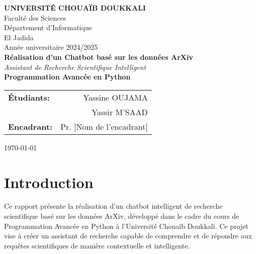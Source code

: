 \documentclass[12pt,a4paper]{article}
\begin{document}
\begin{titlepage}
    \centering
    
    {\Large\textbf{UNIVERSITÉ CHOUAÏB DOUKKALI}}\\[0.5cm]
    {\large Faculté des Sciences}\\[0.2cm]
    {\large Département d'Informatique}\\[0.2cm]
    {\large El Jadida}\\[2cm]
    
    {\large Année universitaire 2024/2025}\\[3cm]
    
    {\Huge\textbf{Réalisation d'un Chatbot basé sur les données ArXiv}}\\[1cm]
    {\Large\textit{Assistant de Recherche Scientifique Intelligent}}\\[3cm]
    
    {\large\textbf{Programmation Avancée en Python}}\\[2cm]
    
    \begin{tabular}{lr}
        \textbf{Étudiants:} & Yassine OUJAMA \\
                           & Yassir M'SAAD \\[1cm]
        \textbf{Encadrant:} & Pr. [Nom de l'encadrant] \\
    \end{tabular}
    
    \vfill
    {\large \today}
\end{titlepage}

\tableofcontents
\newpage

\listoffigures
\newpage

\listoftables
\newpage

\section{Introduction}

Ce rapport présente la réalisation d'un chatbot intelligent de recherche scientifique basé sur les données ArXiv, développé dans le cadre du cours de Programmation Avancée en Python à l'Université Chouaïb Doukkali. Ce projet vise à créer un assistant de recherche capable de comprendre et de répondre aux requêtes scientifiques de manière contextuelle et intelligente.
\end{document}
